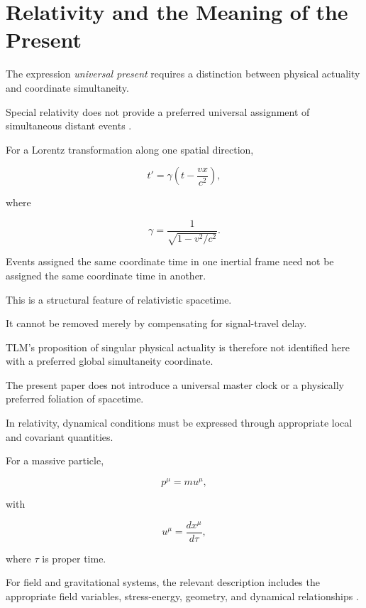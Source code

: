 \documentclass[12pt,onecolumn]{article}
\begin{document}
\section{Relativity and the Meaning of the Present}

The expression \emph{universal present} requires a distinction between physical actuality and coordinate simultaneity.

Special relativity does not provide a preferred universal assignment of simultaneous distant events \cite{Einstein1905,TaylorWheeler1992}.

For a Lorentz transformation along one spatial direction,

\begin{equation}
t'=\gamma\left(t-\frac{vx}{c^2}\right),
\end{equation}

where

\begin{equation}
\gamma=\frac{1}{\sqrt{1-v^2/c^2}}.
\end{equation}

Events assigned the same coordinate time in one inertial frame need not be assigned the same coordinate time in another.

This is a structural feature of relativistic spacetime.

It cannot be removed merely by compensating for signal-travel delay.

TLM's proposition of singular physical actuality is therefore not identified here with a preferred global simultaneity coordinate.

The present paper does not introduce a universal master clock or a physically preferred foliation of spacetime.

In relativity, dynamical conditions must be expressed through appropriate local and covariant quantities.

For a massive particle,

\begin{equation}
p^\mu=mu^\mu,
\end{equation}

with

\begin{equation}
u^\mu=\frac{dx^\mu}{d\tau},
\end{equation}

where $\tau$ is proper time.

For field and gravitational systems, the relevant description includes the appropriate field variables, stress-energy, geometry, and dynamical relationships \cite{Wald1984}.
\end{document}
